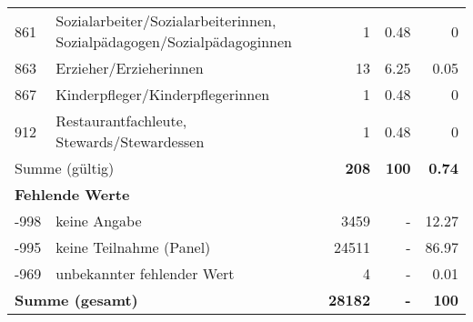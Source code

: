\begin{longtable}{lXrrr}
        861 & \multicolumn{1}{X}{Sozialarbeiter/Sozialarbeiterinnen, Sozialpädagogen/Sozialpädagoginnen} & %
          \num{1} &
          \num[round-mode=places,round-precision=2]{0.48} &
          \num[round-mode=places,round-precision=2]{0} \\

        863 & \multicolumn{1}{X}{Erzieher/Erzieherinnen} & %
          \num{13} &
          \num[round-mode=places,round-precision=2]{6.25} &
          \num[round-mode=places,round-precision=2]{0.05} \\

        867 & \multicolumn{1}{X}{Kinderpfleger/Kinderpflegerinnen} & %
          \num{1} &
          \num[round-mode=places,round-precision=2]{0.48} &
          \num[round-mode=places,round-precision=2]{0} \\

        912 & \multicolumn{1}{X}{Restaurantfachleute, Stewards/Stewardessen} & %
          \num{1} &
          \num[round-mode=places,round-precision=2]{0.48} &
          \num[round-mode=places,round-precision=2]{0} \\

     \midrule
     \multicolumn{2}{l}{Summe (gültig)} &
       \textbf{\num{208}} &
     \textbf{100} &
       \textbf{\num[round-mode=places,round-precision=2]{0.74}} \\
     \multicolumn{5}{l}{\textbf{Fehlende Werte}}\\
       -998 &
       keine Angabe &
         \num{3459} &
        - &
         \num[round-mode=places,round-precision=2]{12.27} \\
       -995 &
       keine Teilnahme (Panel) &
         \num{24511} &
        - &
         \num[round-mode=places,round-precision=2]{86.97} \\
       -969 &
       unbekannter fehlender Wert &
         \num{4} &
        - &
         \num[round-mode=places,round-precision=2]{0.01} \\
     \midrule
     \multicolumn{2}{l}{\textbf{Summe (gesamt)}} &
          \textbf{\num{28182}} &
        \textbf{-} &
        \textbf{100} \\
     \bottomrule
     \end{longtable}
     

